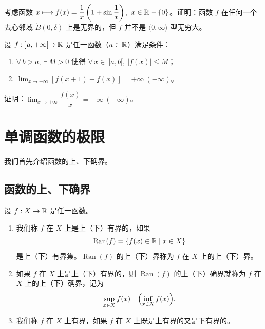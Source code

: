 \begin{exercise}
	\item 考虑函数 \(x\longmapsto f(x)=\dfrac1x\left(1+\sin\dfrac1x\right),\ x\in\R-\{0\}\)。证明：函数 \(f\) 在任何一个去心邻域 \(\mathring{B}(0,\delta)\) 上是无界的，但 \(f\) 并不是 \(\langle0,\infty\rangle\) 型无穷大。
\end{exercise}

\begin{exercise}
	\item 设 \(f:\ ]a,+\infty[\to\mathbb{R}\) 是任一函数（\(a\in\mathbb{R}\)）满足条件：
	\begin{enumerate}[label=\arabic*)]
		\item \(\forall\,b>a,\ \exists\,M>0\) 使得 \(\forall\,x\in\ ]a,b[,\ |f(x)|\le M\)；
		\item \(\lim_{x\to+\infty}[f(x+1)-f(x)]=+\infty\ (-\infty)\)。
	\end{enumerate}
	证明：\(\lim_{x\to+\infty}\dfrac{f(x)}{x}=+\infty\ (-\infty)\)。
\end{exercise}

\section{单调函数的极限}

我们首先介绍函数的上、下确界。

\subsection{函数的上、下确界}

\begin{mydef*}{}

	设 \(f:X\to\mathbb{R}\) 是任一函数。

	\begin{enumerate}[label=\arabic*)]
		\item 我们称 \(f\) 在 \(X\) 上是上（下）有界的，如果
		\[
		\operatorname{Ran}(f)=\{f(x)\in\mathbb{R} \mid x\in X\}
		\]
		是上（下）有界集。\(\operatorname{Ran}(f)\) 的上（下）界称为 \(f\) 在 \(X\) 上的上（下）界。

		\item 如果 \(f\) 在 \(X\) 上是上（下）有界的，则 \(\operatorname{Ran}(f)\) 的上（下）确界就称为 \(f\) 在 \(X\) 上的上（下）确界，记为
		\[
		\sup_{x\in X}f(x)\quad \Bigl(\inf_{x\in X}f(x)\Bigr).
		\]

		\item 我们称 \(f\) 在 \(X\) 上有界，如果 \(f\) 在 \(X\) 上既是上有界的又是下有界的。
	\end{enumerate}

\end{mydef*}

